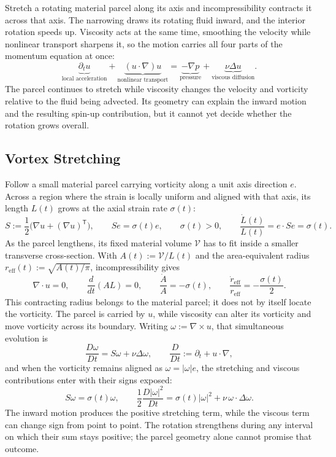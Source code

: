 
Stretch a rotating material parcel along its axis and incompressibility contracts it across that axis. The narrowing draws its rotating fluid inward, and the interior rotation speeds up. Viscosity acts at the same time, smoothing the velocity while nonlinear transport sharpens it, so the motion carries all four parts of the momentum equation at once:
\[
  \underbrace{\partial_t u}_{\text{local acceleration}}
  +
  \underbrace{(u\cdot\nabla)u}_{\text{nonlinear transport}}
  =
  \underbrace{-\nabla p}_{\text{pressure}}
  +
  \underbrace{\nu\Delta u}_{\text{viscous diffusion}}.
\]
The parcel continues to stretch while viscosity changes the velocity and vorticity relative to the fluid being advected. Its geometry can explain the inward motion and the resulting spin-up contribution, but it cannot yet decide whether the rotation grows overall.

\subsection{Vortex Stretching}\label{sub:ThePerfectlyStretchingVortex}

Follow a small material parcel carrying vorticity along a unit axis direction \(e\). Across a region where the strain is locally uniform and aligned with that axis, its length \(L(t)\) grows at the axial strain rate \(\sigma(t)\):
\[
  S:=\frac12\bigl(\nabla u+(\nabla u)^{\mathsf T}\bigr),
  \qquad
  Se=\sigma(t)e,
  \qquad
  \sigma(t)>0,
  \qquad
  \frac{\dot L(t)}{L(t)}
  =
  e\cdot Se
  =
  \sigma(t).
\]
As the parcel lengthens, its fixed material volume \(\mathcal V\) has to fit inside a smaller transverse cross-section. With \(A(t):=\mathcal V/L(t)\) and the area-equivalent radius \(r_{\mathrm{eff}}(t):=\sqrt{A(t)/\pi}\), incompressibility gives
\[
  \nabla\cdot u=0,
  \qquad
  \frac{d}{dt}(A L)=0,
  \qquad
  \frac{\dot A}{A}=-\sigma(t),
  \qquad
  \frac{\dot r_{\mathrm{eff}}}{r_{\mathrm{eff}}}
  =
  -\frac{\sigma(t)}{2}.
\]
This contracting radius belongs to the material parcel; it does not by itself locate the vorticity. The parcel is carried by \(u\), while viscosity can alter its vorticity and move vorticity across its boundary. Writing \(\omega:=\nabla\times u\), that simultaneous evolution is
\[
  \frac{D\omega}{Dt}
  =
  S\omega+\nu\Delta\omega,
  \qquad
  \frac{D}{Dt}
  :=
  \partial_t+u\cdot\nabla,
\]
and when the vorticity remains aligned as \(\omega=|\omega|e\), the stretching and viscous contributions enter with their signs exposed:
\[
  S\omega
  =
  \sigma(t)\omega,
  \qquad
  \frac12\frac{D|\omega|^2}{Dt}
  =
  \sigma(t)|\omega|^2
  +
  \nu\,\omega\cdot\Delta\omega.
\]
The inward motion produces the positive stretching term, while the viscous term can change sign from point to point. The rotation strengthens during any interval on which their sum stays positive; the parcel geometry alone cannot promise that outcome.


